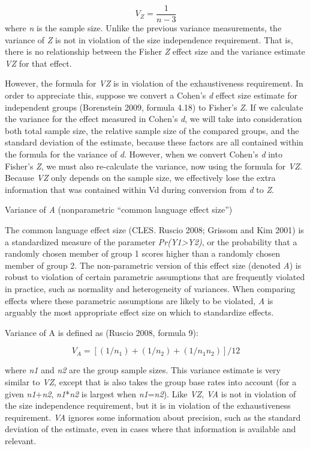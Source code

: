 \documentclass[]{article}
\begin{document}
\[
\begin{equation}
V_Z=\frac{1}{n-3}
\label{eq:varZ}
\tag{7}
\end{equation}
\] where \emph{n} is the sample size. Unlike the previous variance
measurements, the variance of \emph{Z} is not in violation of the size
independence requirement. That is, there is no relationship between the
Fisher \emph{Z} effect size and the variance estimate \emph{VZ} for that
effect.

However, the formula for \emph{VZ} is in violation of the exhaustiveness
requirement. In order to appreciate this, suppose we convert a Cohen's
\emph{d} effect size estimate for independent groups (Borenstein 2009,
formula 4.18) to Fisher's \emph{Z}. If we calculate the variance for the
effect measured in Cohen's \emph{d}, we will take into consideration
both total sample size, the relative sample size of the compared groups,
and the standard deviation of the estimate, because these factors are
all contained within the formula for the variance of \emph{d}. However,
when we convert Cohen's \emph{d} into Fisher's \emph{Z}, we must also
re-calculate the variance, now using the formula for \emph{VZ}. Because
\emph{VZ} only depends on the sample size, we effectively lose the extra
information that was contained within Vd during conversion from \emph{d}
to \emph{Z}.

Variance of \emph{A} (nonparametric ``common language effect size'')

The common language effect size (CLES. Ruscio 2008; Grissom and Kim
2001) is a standardized measure of the parameter
\emph{Pr(Y1\textgreater{}Y2)}, or the probability that a randomly chosen
member of group 1 scores higher than a randomly chosen member of group
2. The non-parametric version of this effect size (denoted \emph{A}) is
robust to violation of certain parametric assumptions that are
frequently violated in practice, such as normality and heterogeneity of
variances. When comparing effects where these parametric assumptions are
likely to be violated, \emph{A} is arguably the most appropriate effect
size on which to standardize effects.

Variance of A is defined as (Ruscio 2008, formula 9):

\[
\begin{equation}
V_A=[(1/n_1)+(1/n_2)+(1/n_1n_2)]/12
\label{eq:varA}
\tag{8}
\end{equation}
\]

where \emph{n1} and \emph{n2} are the group sample sizes. This variance
estimate is very similar to \emph{VZ}, except that is also takes the
group base rates into account (for a given \emph{n1}+\emph{n2},
\emph{n1}*\emph{n2} is largest when \emph{n1}=\emph{n2}). Like
\emph{VZ}, \emph{VA} is not in violation of the size independence
requirement, but it is in violation of the exhaustiveness requirement.
\emph{VA} ignores some information about precision, such as the standard
deviation of the estimate, even in cases where that information is
available and relevant.
\end{document}
